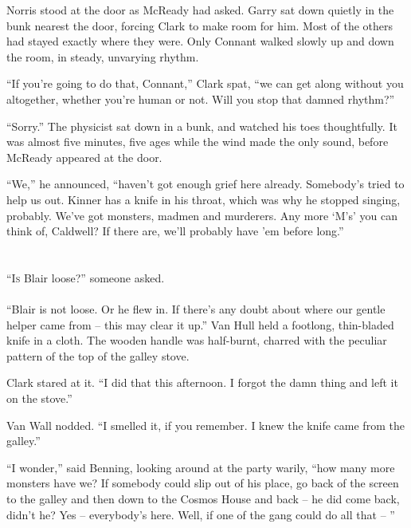 \documentclass[letterpaper,openany,12pt]{memoir}		%
\begin{document}
Norris stood at the door as McReady had asked. Garry sat down quietly in the
bunk nearest the door, forcing Clark to make room for him. Most of the others
had stayed exactly where they were. Only Connant walked slowly up and down the
room, in steady, unvarying rhythm.

``If you're going to do that, Connant,'' Clark spat, ``we can get along without
you altogether, whether you're human or not. Will you stop that damned rhythm?''

``Sorry.'' The physicist sat down in a bunk, and watched his toes thoughtfully.
It was almost five minutes, five ages while the wind made the only sound, before
McReady appeared at the door.

``We,'' he announced, ``haven't got enough grief here already. Somebody's tried
to help us out. Kinner has a knife in his throat, which was why he stopped
singing, probably. We've got monsters, madmen and murderers. Any more `M's' you
can think of, Caldwell? If there are, we'll probably have 'em before long.''


\chapter[Chapter 11]{}

\lettrine[lines=3,findent=3pt,nindent=2pt]{``I}{s} Blair loose?'' someone
asked.\\\\

``Blair is not loose. Or he flew in. If there's any doubt about where our gentle
helper came from -- this may clear it up.'' Van Hull held a footlong,
thin-bladed knife in a cloth. The wooden handle was half-burnt, charred with the
peculiar pattern of the top of the galley stove.

Clark stared at it. ``I did that this afternoon. I forgot the damn thing and
left it on the stove.''

Van Wall nodded. ``I smelled it, if you remember. I knew the knife came from the
galley.''

``I wonder,'' said Benning, looking around at the party warily, ``how many more
monsters have we? If somebody could slip out of his place, go back of the screen
to the galley and then down to the Cosmos House and back -- he did come back,
didn't he? Yes -- everybody's here. Well, if one of the gang could do all that
-- ''
\end{document}
